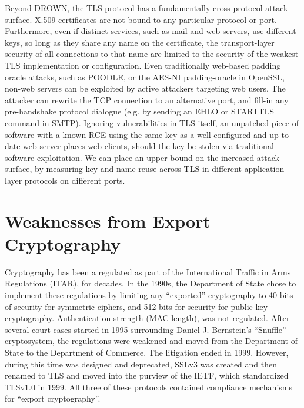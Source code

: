 Beyond DROWN, the TLS protocol has a fundamentally cross-protocol attack
surface. X.509 certificates are not bound to any particular protocol or port.
Furthermore, even if distinct services, such as mail and web servers, use
different keys, so long as they share any name on the certificate, the
transport-layer security of all connections to that name are limited to the
security of the weakest TLS implementation or configuration. Even traditionally
web-based padding oracle attacks, such as POODLE, or the AES-NI padding-oracle
in OpenSSL, non-web servers can be exploited by active attackers targeting web
users. The attacker can rewrite the TCP connection to an alternative port, and
fill-in any pre-handshake protocol dialogue (e.g. by sending an EHLO or
STARTTLS command in SMTP). Ignoring vulnerabilities in TLS itself, an unpatched
piece of software with a known RCE using the same key as a well-configured and
up to date web server places web clients, should the key be stolen via
traditional software exploitation. We can place an upper bound on the increased
attack surface, by measuring key and name reuse across TLS in different
application-layer protocols on different ports.

\section{Weaknesses from Export Cryptography}

Cryptography has been a regulated as part of the International Traffic in Arms
Regulations (ITAR), for decades. In the 1990s, the Department of State chose to
implement these regulations by limiting any ``exported'' cryptography to
40-bits of security for symmetric ciphers, and 512-bits for security for
public-key cryptography. Authentication strength (\eg MAC length), was not
regulated. After several court cases started in 1995 surrounding Daniel J.
Bernstein's ``Snuffle'' cryptosystem, the regulations were weakened and moved
from the Department of State to the Department of Commerce. The litigation
ended in 1999. However, during this time \ssltwo was designed and deprecated,
SSLv3 was created and then renamed to TLS and moved into the purview of the
IETF, which standardized TLSv1.0 in 1999. All three of these protocols
contained compliance mechanisms for ``export cryptography''.

